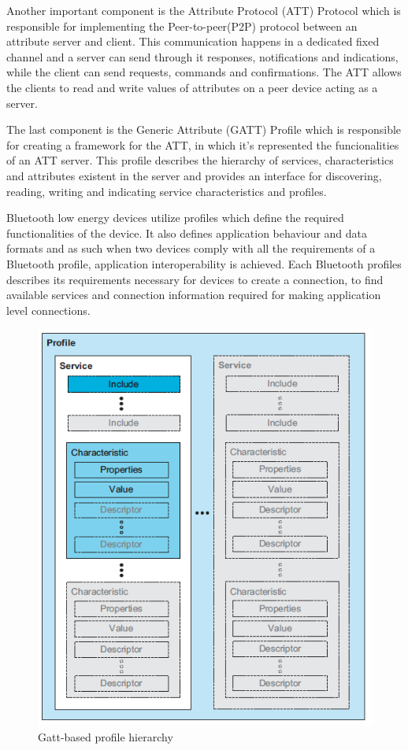 \documentclass[a4paper]{IEEEtran}
\begin{document}
Another important component is the Attribute Protocol (ATT) Protocol which is responsible for implementing the Peer-to-peer(P2P) protocol between an attribute server and client. This communication happens in a dedicated fixed  channel and a server can send through it responses, notifications and indications, while the client can send requests, commands and confirmations. The ATT allows the clients to read and write values of attributes on a peer device acting as a server.

The last component is the Generic Attribute (GATT) Profile which is responsible for creating a framework for the ATT, in which it's represented the funcionalities of an ATT server. This profile describes the hierarchy of services, characteristics and attributes existent in the server and provides an interface for discovering, reading, writing and indicating service characteristics and profiles.

Bluetooth low energy devices utilize profiles which define the required functionalities of the device. It also defines application behaviour and data formats and as such when two devices comply with all the requirements of a Bluetooth profile, application interoperability is achieved. Each Bluetooth profiles describes its requirements necessary for devices to create a connection, to find available services and connection information required for making application level connections.

\begin{figure}
	\centering
		\includegraphics[width=0.5\linewidth]{figures/profile.png}
	\caption[Gatt-based profile hierarchy]{Gatt-based profile hierarchy}
	\label{fig:profile}
\end{figure}
\end{document}
